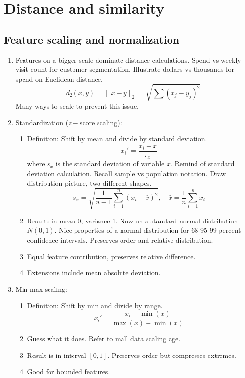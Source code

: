 \documentclass{article}
\begin{document}
\section*{Distance and similarity} 


\subsection*{Feature scaling and normalization}

\begin{enumerate}
\item Features on a bigger scale dominate distance calculations. Spend vs weekly visit count for customer segmentation. Illustrate dollars vs thousands for spend on Euclidean distance.
\[
d_2(x,y) = \|x-y\|_2 = \sqrt{\sum (x_j-y_j)^2}
\]
Many ways to scale to prevent this issue.

\item Standardization ($z-$score scaling):
\begin{enumerate}
\item Definition: Shift by mean and divide by standard deviation.
\[
x_i' = \frac{x_i - \overline{x}}{s_x}
\]
where $s_x$ is the standard deviation of variable $x$. Remind of standard deviation calculation. Recall sample vs population notation. Draw distribution picture, two different shapes.
\[
s_x = \sqrt{\frac{1}{n-1}\sum_{i=1}^n (x_i - \bar{x})^2}, \quad
\bar{x} = \frac{1}{n}\sum_{i=1}^n x_i
\]
\item Results in mean 0, variance 1. Now on a standard normal distribution $N(0,1)$. Nice properties of a normal distribution for 68-95-99 percent confidence intervals. Preserves order and relative distribution.
\item Equal feature contribution, preserves relative difference.
\item Extensions include mean absolute deviation.
\end{enumerate}

\item Min-max scaling: 
\begin{enumerate}
\item Definition: Shift by min and divide by range.
\[
x_i' = \frac{x_i - \min(x)}{\max(x)-\min(x)}
\]
\item Guess what it does. Refer to mall data scaling age.
\item Result is in interval $[0,1]$. Preserves order but compresses extremes.
\item Good for bounded features. 
\end{enumerate}


\end{enumerate}
\end{document}

